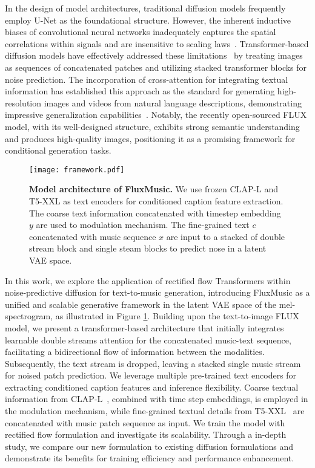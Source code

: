 In the design of model architectures, traditional diffusion models frequently employ U-Net \cite{ronneberger2015u} as the foundational structure. However, the inherent inductive biases of convolutional neural networks inadequately captures the spatial correlations within signals \cite{esser2021taming} and are insensitive to scaling laws~\cite{li2024scalability}. Transformer-based diffusion models have effectively addressed these limitations~\cite{Peebles_2023,bao2023all,fei2024scalable,fei2024diffusion} by treating images as sequences of concatenated patches and utilizing stacked transformer blocks for noise prediction. The incorporation of cross-attention  for integrating textual information has established this approach as the standard for generating high-resolution images and videos from natural language descriptions, demonstrating impressive generalization capabilities~\cite{chen2023pixart,chen2024pixarts,fei2024dimba,esser2024scaling,fei2023jepa,ma2024latte,ma2024latte,yang2024cogvideox}. Notably, the recently open-sourced FLUX model, with its well-designed structure, exhibits strong semantic understanding and produces high-quality images, positioning it as a promising framework for conditional generation tasks.

\begin{figure}[t]
  \centering
   \texttt{[image: framework.pdf]}
   \caption{\textbf{Model architecture of FluxMusic. }  We use frozen CLAP-L and T5-XXL as text encoders for conditioned caption feature extraction. The coarse text information concatenated with timestep embedding $y$ are used to modulation mechanism. The fine-grained text $c$ concatenated with music sequence $x$ are input to a stacked of double stream block and single steam blocks to predict nose in a latent VAE space.
   }
   \label{fig:framework} 
\end{figure}

In this work, we explore the application of rectified flow Transformers within noise-predictive diffusion for text-to-music generation, introducing FluxMusic as a unified and scalable generative framework in the latent VAE space of the mel-spectrogram, as illustrated in Figure \ref{fig:framework}. 
Building upon the text-to-image FLUX model, we present a transformer-based architecture that initially integrates learnable double streams attention for the concatenated music-text sequence, facilitating a bidirectional flow of information between the modalities. Subsequently, the text stream is dropped, leaving a stacked single music stream for noised patch prediction. We leverage multiple pre-trained text encoders for extracting conditioned caption features and inference flexibility. Coarse textual information from CLAP-L~\cite{elizalde2023clap}, combined with time step embeddings, is employed in the modulation mechanism, while fine-grained textual details from T5-XXL~\cite{raffel2020exploring} are concatenated with music patch sequence as input. We train the model with rectified flow formulation and investigate its scalability. Through a in-depth study, we compare our new formulation to existing diffusion formulations and demonstrate its benefits for training efficiency and performance enhancement.

